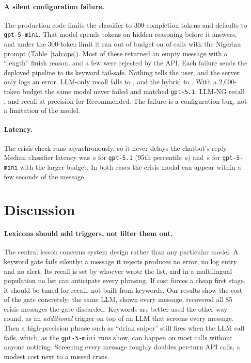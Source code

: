 \paragraph{A silent configuration failure.} The production code limits the classifier to 300 completion tokens and defaults to \texttt{gpt-5-mini}. That model spends tokens on hidden reasoning before it answers, and under the 300-token limit it ran out of budget on  of calls with the Nigerian prompt (Table~\ref{tab:ops}). Most of these returned an empty message with a ``length'' finish reason, and a few were rejected by the API. Each failure sends the deployed pipeline to its keyword fail-safe. Nothing tells the user, and the server only logs an error. LLM-only recall falls to , and the hybrid to . With a 2{,}000-token budget the same model never failed and matched \texttt{gpt-5.1}: LLM-NG recall , and  recall at  precision for Recommended. The failure is a configuration bug, not a limitation of the model.

\paragraph{Latency.} The crisis check runs asynchronously, so it never delays the chatbot's reply. Median classifier latency was \,s for \texttt{gpt-5.1} (95th percentile \,s) and \,s for \texttt{gpt-5-mini} with the larger budget. In both cases the crisis modal can appear within a few seconds of the message.

\section{Discussion}\label{sec:discussion}

\paragraph{Lexicons should add triggers, not filter them out.} The central lesson concerns system design rather than any particular model. A keyword gate fails silently: a message it rejects produces no error, no log entry and no alert. Its recall is set by whoever wrote the list, and in a multilingual population no list can anticipate every phrasing. If cost forces a cheap first stage, it should be tuned for recall, not built from keywords. Our results show the cost of the gate concretely: the same LLM, shown every message, recovered all 85 crisis messages the gate discarded. Keywords are better used the other way round, as an \emph{additional} trigger on top of an LLM that screens every message. Then a high-precision phrase such as ``drink sniper'' still fires when the LLM call fails, which, as the \texttt{gpt-5-mini} runs show, can happen on most calls without anyone noticing. Screening every message roughly doubles per-turn API calls, a modest cost next to a missed crisis.

